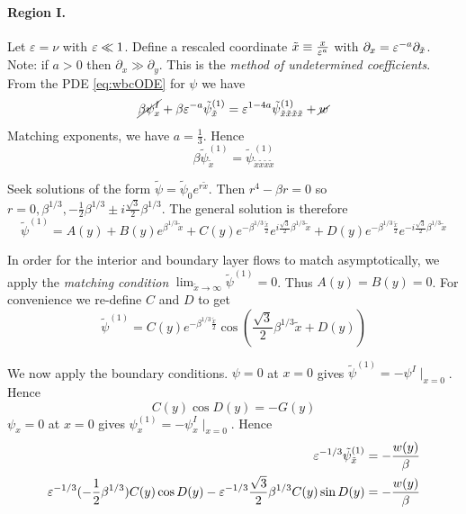 \documentclass{jknotes}
\begin{document}
\paragraph{Region I.} Let $\varepsilon = \nu$ with $\varepsilon \ll 1$. Define a
rescaled coordinate $\tilde{x} \equiv \frac{x}{\varepsilon^a}$ with $\partial_x =
\varepsilon^{-a}\partial_{\tilde{x}}$. Note: if $a > 0$ then $\partial_x \gg
\partial_y$. This is the \emph{method of undetermined coefficients}. From the
PDE \eqref{eq:wbcODE} for $\psi$ we have
\begin{equation}
	\cancel{\beta \psi_x^I} + \beta \varepsilon^{-a} \tilde{\psi}_{\tilde{x}}^{(1)}
	= \varepsilon^{1-4a} \tilde{\psi}^{(1)}_{\tilde{x}\tilde{x}\tilde{x}\tilde{x}}
	+ \cancel{w} 
\end{equation}
Matching exponents, we have $a = \frac{1}{3}$. Hence 
\begin{equation}
	\beta \tilde{\psi}_{\tilde{x}}^{(1)} =
	\tilde{\psi}^{(1)}_{\tilde{x}\tilde{x}\tilde{x}\tilde{x}}\label{eq:wbcODE2}
\end{equation}

Seek solutions of the form $\tilde{\psi} = \tilde{\psi}_0 e^{r\tilde{x}}$.
Then $r^4 - \beta r = 0$ so $r =0, \beta^{1/3}, -\frac{1}{2}\beta^{1/3} \pm
i\frac{\sqrt{3}}{2}\beta^{1/3}$. The general solution is therefore
\begin{equation}
	\tilde{\psi}^{(1)} = A(y) + B(y)e^{\beta^{1/3} \tilde{x}} +
	C(y)e^{-\beta^{1/3}\frac{\tilde{x}}{2}}e^{i\frac{\sqrt{3}}{2}\beta^{1/3}\tilde{x}}
	+ D(y)e^{-\beta^{1/3}\frac{\tilde{x}}{2}}e^{-i\frac{\sqrt{3}}{2}\beta^{1/3}\tilde{x}}
\end{equation}

In order for the interior and boundary layer flows to match asymptotically, we
apply the \emph{matching condition} $\lim_{\tilde{x} \to \infty}
\tilde{\psi}^{(1)} = 0$. Thus $A(y) = B(y) = 0$. For convenience we re-define
$C$ and $D$ to get
\begin{equation}
	\tilde{\psi}^{(1)} = C(y)e^{-\beta^{1/3}\frac{\tilde{x}}{2}} \cos \left(
	\frac{\sqrt{3}}{2}\beta^{1/3}\tilde{x} + D(y)\right)
\end{equation}

We now apply the boundary conditions. $\psi = 0$ at $x = 0$ gives
$\tilde{\psi}^{(1)} = -\psi^I\mid_{x=0}$. Hence
\begin{equation}
	C(y)\cos D(y) = -G(y)
\end{equation}
$\psi_x = 0$ at $x=0$ gives $\psi_x^{(1)} = -\psi_x^I\mid_{x=0}$. Hence
\begin{align}
	\varepsilon^{-1/3}\tilde{\psi}_{\tilde{x}}^{(1)} &= -\frac{w(y)}{\beta} \\
	\varepsilon^{-1/3}(-\frac{1}{2}\beta^{1/3})C(y)\cos D(y) -
	\varepsilon^{-1/3}\frac{\sqrt{3}}{2} \beta^{1/3}C(y)\sin D(y) &=
	-\frac{w(y)}{\beta}
\end{align}
\end{document}
